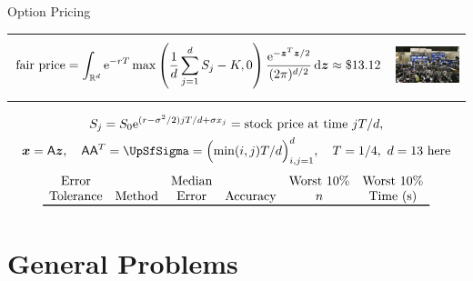 \documentclass[11pt,compress,xcolor={usenames,dvipsnames},aspectratio=169]{beamer}
\newcommand{\financePict}{\href{http://i2.cdn.turner.com/money/dam/assets/130611131918-chicago-board-options-exchange-1024x576.jpg}{\includegraphics[width
		= 3cm]{ProgramsImages/130611131918-chicago-board-options-exchange-1024x576.jpg}}}
\begin{document}
\begin{frame}{ Option Pricing}
\vspace{-12ex}
\begin{tabular}{m{11cm}m{2.5cm}}
	\[
	\begin{aligned}
	 \text{fair price} = 
	\int_{\mathbb{R}^d}\mathrm{e}^{-r T}\max\left(\frac{1}{d}\sum_{j=1}^d S_{j}-K, 0\right) 
	\frac{\mathrm{e}^{-\boldsymbol{z}^T\boldsymbol{z}/2}}{(2\pi)^{d/2}}\,{\rm d} \boldsymbol{z} \approx \$13.12
	\end{aligned}
	\]
	& 
	\financePict
\end{tabular}
\vspace{-4ex}
\begin{gather*}
S_{j} =  S_0\me^{(r-\sigma^2/2)jT/d+\sigma x_j} = \text{stock price at time } 
jT/d, \\
\vx  = \mA \vz, \quad \mA \mA^T = \mSigma = \Bigl ( \min(i,j) T/d \Bigr) _{i,j = 1}^d,
\quad T = 1/4, \ d=13 \text{ here}
\end{gather*}
\begin{equation*}
\begin{array}{cccccccc}
\text{Error}& && \text{Median}&& \text{Worst 10\%} & \text{Worst 10\%} \\
\text{Tolerance} & \multicolumn{2}{c}{\text{Method}}  & \text{Error} & \text{Accuracy} 
& n & \text{Time (s)} \\
\toprule

\end{array}
\end{equation*}
\vspace{-8ex}

\end{frame}


\section{General Problems}
\end{document}
